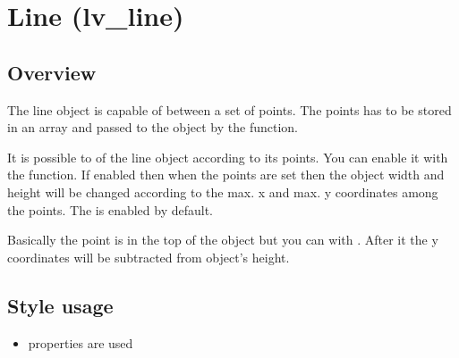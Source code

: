 \documentclass[letterpaper,10pt,english]{sphinxmanual}
\begin{document}
\begin{sphinxVerbatim}[commandchars=\\\{\}]
   
 
    
\end{sphinxVerbatim}


\section{Line (lv\_line)}
\label{\detokenize{object-types/line:line-lv-line}}\label{\detokenize{object-types/line::doc}}

\subsection{Overview}
\label{\detokenize{object-types/line:overview}}
The line object is capable of  between a set of points. The points has to be stored in an  array and passed to the object by the  function.

It is possible to  of the line object according to its points. You can enable it with the  function. If enabled then when the points are set then the object width and height will be changed according to the max. x and max. y coordinates among the points. The  is enabled by default.

Basically the  point is in the top of the object but you can  with . After it the y coordinates will be subtracted from object’s height.


\subsection{Style usage}
\label{\detokenize{object-types/line:style-usage}}\begin{itemize}
\item {} 
 properties are used

\end{itemize}
\end{document}
